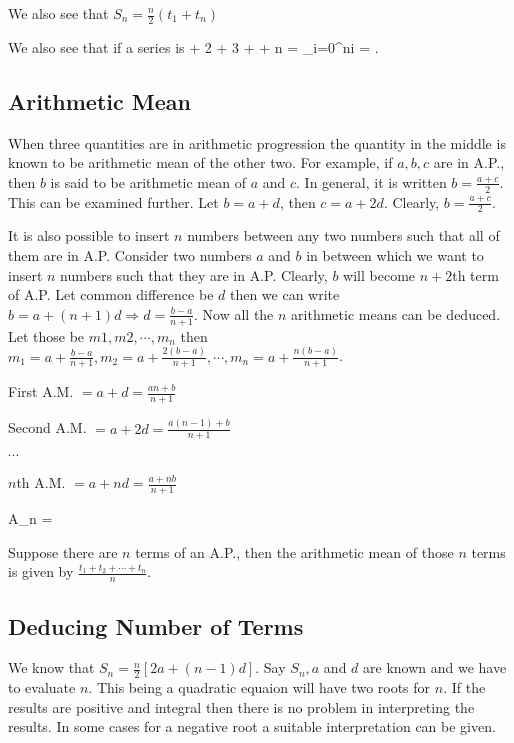 We also see that $S_n = \frac{n}{2}(t_1 + t_n)$

We also see that if a series is \placeformula\startformula{} + 2 + 3 +
  \cdots + n = \sum_{i=0}^ni = .\stopformula

\subsection{Arithmetic Mean}
When three quantities are in arithmetic progression the quantity in the middle is known to be arithmetic mean of the other two. For
example, if $a, b, c$ are in A.P., then $b$ is said to be arithmetic mean of $a$ and $c$. In general, it is written $b = \frac{a +
  c}{2}$. This can be examined further. Let $b = a + d$, then $c = a + 2d$. Clearly, $b = \frac{a + c}{2}$.

It is also possible to insert $n$ numbers between any two numbers such that all of them are in A.P. Consider two numbers $a$ and
$b$ in between which we want to insert $n$ numbers such that they are in A.P. Clearly, $b$ will become $n +2$th term of A.P. Let
common difference be $d$ then we can write $b = a + (n + 1)d \Rightarrow d = \frac{b - a}{n + 1}$. Now all the $n$ arithmetic means
can be deduced. Let those be $m1, m2, \cdots, m_n$ then $m_1 = a + \frac{b - a}{n + 1}, m_2 = a + \frac{2(b - a)}{n + 1}, \cdots,
m_n = a + \frac{n(b - a)}{n + 1}$.

First A.M. $= a + d = \frac{an + b}{n +1}$

Second A.M. $= a + 2d = \frac{a(n - 1) + b}{n + 1}$

$\cdots$

$n$th A.M. $= a + nd = \frac{a + nb}{n + 1}$

\placeformula\startformula A_n = \stopformula

Suppose there are $n$ terms of an A.P., then the arithmetic mean of those $n$ terms is given by $\frac{t_1 + t_2 + \cdots +
  t_n}{n}$.

\subsection{Deducing Number of Terms}
We know that $S_n = \frac{n}{2}[2a + (n - 1)d]$. Say $S_n, a$ and $d$ are known and we have to evaluate $n$. This being a quadratic
equaion will have two roots for $n$. If the results are positive and integral then there is no problem in interpreting the
results. In some cases for a negative root a suitable interpretation can be given.

